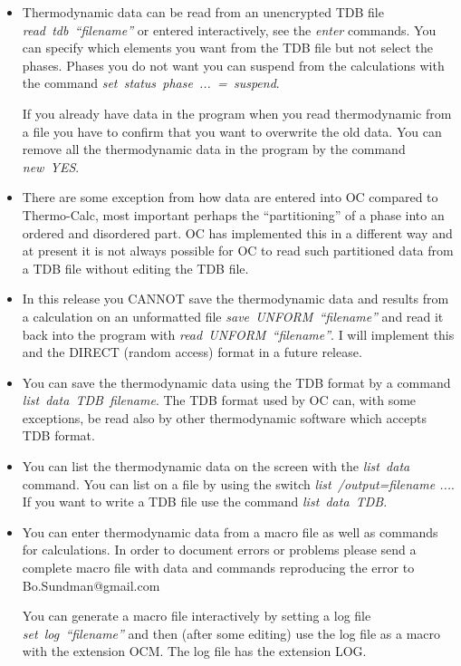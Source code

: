 \documentclass[12pt]{article}
\begin{document}
\begin{itemize}
\item Thermodynamic data can be read from an unencrypted TDB file {\em
  read~tdb~``filename''} or entered interactively, see the {\em enter}
  commands.  You can specify which elements you want from the TDB file
  but not select the phases.  Phases you do not want you can suspend
  from the calculations with the command {\em
    set~status~phase~...~=~suspend}.

  If you already have data in the program when you read thermodynamic
  from a file you have to confirm that you want to overwrite the old
  data.  You can remove all the thermodynamic data in the program by
  the command {\em new~YES}.

\item There are some exception from how data are entered into OC
  compared to Thermo-Calc, most important perhaps the ``partitioning''
  of a phase into an ordered and disordered part.  OC has implemented
  this in a different way and at present it is not always possible for
  OC to read such partitioned data from a TDB file without editing the
  TDB file.

\item In this release you CANNOT save the thermodynamic data and
  results from a calculation on an unformatted file {\em
    save~UNFORM~``filename''} and read it back into the program with
  {\em read~UNFORM~``filename''}.  I will implement this and the
  DIRECT (random access) format in a future release.

\item You can save the thermodynamic data using the TDB format by a
  command\\ {\em list~data~TDB~filename}.  The TDB format used by OC
  can, with some exceptions, be read also by other thermodynamic
  software which accepts TDB format.

\item You can list the thermodynamic data on the screen with the {\em
  list~data} command.  You can list on a file by using the switch {\em
  list~/output=filename ...}.  If you want to write a TDB file use the
  command {\em list~data~TDB}.
  
\item You can enter thermodynamic data from a macro file as well as
  commands for calculations.  In order to document errors or problems
  please send a complete macro file with data and commands reproducing
  the error to Bo.Sundman@gmail.com

  You can generate a macro file interactively by setting a log file
  {\em set~log~``filename''} and then (after some editing) use the log
  file as a macro with the extension OCM.  The log file has the
  extension LOG.
\end{itemize}
\end{document}
